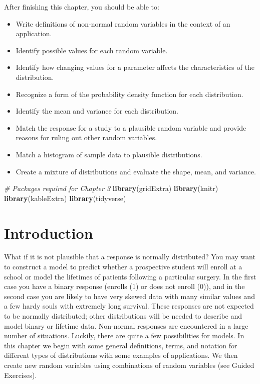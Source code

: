 \documentclass[
]{krantz}
\newenvironment{Shaded}{\begin{snugshade}}{\end{snugshade}}
\newcommand{\CommentTok}[1]{\textcolor[rgb]{0.37,0.37,0.37}{\textit{#1}}}
\newcommand{\KeywordTok}[1]{\textcolor[rgb]{0.27,0.27,0.27}{\textbf{#1}}}
\newcommand{\NormalTok}[1]{#1}
\providecommand{\tightlist}{%
  \setlength{\itemsep}{0pt}\setlength{\parskip}{0pt}}
\begin{document}
After finishing this chapter, you should be able to:

\begin{itemize}
\tightlist
\item
  Write definitions of non-normal random variables in the context of an application.
\item
  Identify possible values for each random variable.
\item
  Identify how changing values for a parameter affects the characteristics of the distribution.
\item
  Recognize a form of the probability density function for each distribution.
\item
  Identify the mean and variance for each distribution.
\item
  Match the response for a study to a plausible random variable and provide reasons for ruling out other random variables.
\item
  Match a histogram of sample data to plausible distributions.
\item
  Create a mixture of distributions and evaluate the shape, mean, and variance.
\end{itemize}

\begin{Shaded}
\begin{Highlighting}[]
\CommentTok{# Packages required for Chapter 3}
\KeywordTok{library}\NormalTok{(gridExtra)  }
\KeywordTok{library}\NormalTok{(knitr) }
\KeywordTok{library}\NormalTok{(kableExtra)}
\KeywordTok{library}\NormalTok{(tidyverse)}
\end{Highlighting}
\end{Shaded}

\hypertarget{introduction}{%
\section{Introduction}\label{introduction}}

What if it is not plausible that a response is normally distributed? You may want to construct a model to predict whether a prospective student will enroll at a school or model the lifetimes of patients following a particular surgery. In the first case you have a binary response (enrolls (1) or does not enroll (0)), and in the second case you are likely to have very skewed data with many similar values and a few hardy souls with extremely long survival. These responses are not expected to be normally distributed; other distributions will be needed to describe and model binary or lifetime data. Non-normal responses are encountered in a large number of situations. Luckily, there are quite a few possibilities for models. In this chapter we begin with some general definitions, terms, and notation for different types of distributions with some examples of applications. We then create new random variables using combinations of random variables (see Guided Exercises).
\end{document}
